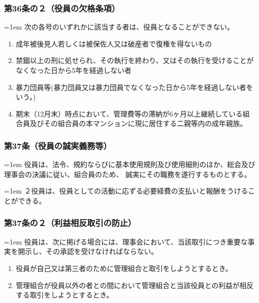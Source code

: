 \documentclass[
  twoside,
  luatex,
  paper=a4paper,
  fontsize=11pt,
  jafontsize=11pt,
  jlreq_notes,
]{jlreq}
\newcommand{\joumain}[1]{%
  \noindent\hangindent=1em\hangafter=1
  \hspace{1em}#1%
}
\newcommand{\kou}[2]{%
  \par\noindent\hangindent=1em\hangafter=1
  #1\hspace{1em}#2%
}
\begin{document}
  \subsubsection*{第36条の２（役員の欠格条項）}
  \joumain{次の各号のいずれかに該当する者は、役員となることができない。}
  \begin{enumerate}
    \item 成年被後見人若しくは被保佐人又は破産者で復権を得ないもの
    \item 禁錮以上の刑に処せられ、その執行を終わり、又はその執行を受けることがなくなった日から5年を経過しない者
    \item 暴力団員等(暴力団員又は暴力団員でなくなった日から5年を経過しない者をいう。)
    \item 期末（12月末）時点において、管理費等の滞納が6ヶ月以上継続している組合員及びその組合員の本マンションに現に居住する二親等内の成年親族。
  \end{enumerate}

  \subsubsection*{第37条（役員の誠実義務等）}
  \joumain{役員は、法令、規約ならびに基本使用規則及び使用細則のほか、総会及び理事会の決議に従い、組合員のため、
  誠実にその職務を遂行するものとする。}
  \kou{２}{役員は、役員としての活動に応ずる必要経費の支払いと報酬をうけることができる。}

  \subsubsection*{第37条の２（利益相反取引の防止）}
  \joumain{役員は、次に掲げる場合には、理事会において、当該取引につき重要な事実を開示し、その承認を受けなければならない。}
  \begin{enumerate}
    \item 役員が自己又は第三者のために管理組合と取引をしようとするとき。
    \item 管理組合が役員以外の者との間において管理組合と当該役員との利益が相反する取引をしようとするとき。
  \end{enumerate}
\end{document}
